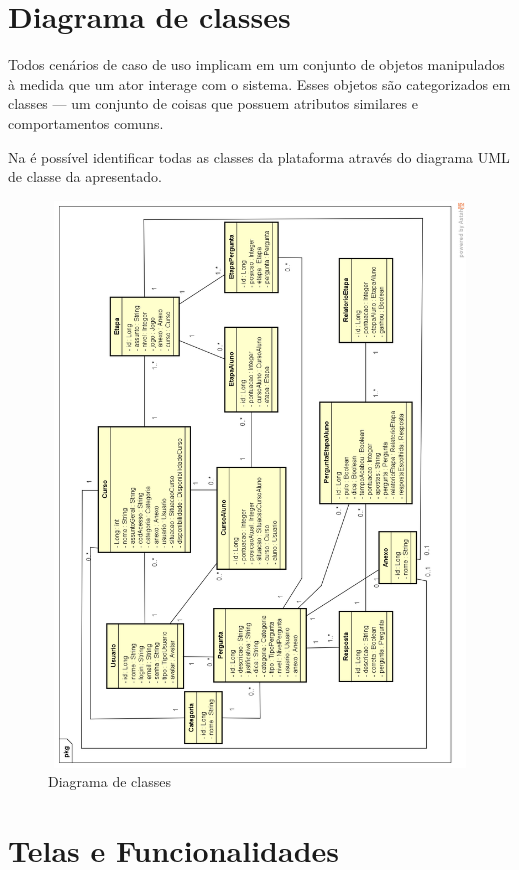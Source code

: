 \section{Diagrama de classes}

Todos cenários de caso de uso implicam em um conjunto de objetos manipulados à medida que um ator interage com o sistema. Esses objetos são categorizados em classes — um conjunto de coisas que possuem atributos similares e comportamentos comuns. \citep{SOMMERVILLE2011}

Na  é possível identificar  todas as classes da plataforma através do diagrama UML de classe da apresentado.

\begin{figure}[htp]
\begin{center}
  \includegraphics[width=15cm, height=15cm]{images/proposta-img/Figura4-7.png}
  \caption{Diagrama de classes}
  \label{fig:Figura4-7}
\end{center}
\end{figure}


\section{Telas e Funcionalidades}

